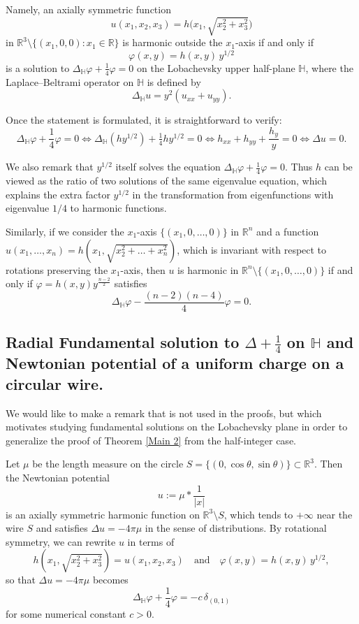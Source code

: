 \documentclass{article}
\begin{document}
Namely, an axially symmetric function
\[
u(x_1,x_2,x_3)=h\bigl(x_1, \sqrt{x_2^2+x_3^2}\bigr)
\]
in \(\mathbb{R}^3 \setminus \{(x_1,0,0): x_1\in\mathbb{R}\}\) is harmonic outside the \(x_1\)-axis if and only if
\[
\varphi(x,y)=h(x,y)\,y^{1/2}
\]
is a solution to \(\Delta_\mathbb{H}\varphi+\frac{1}{4}\varphi=0\) on the Lobachevsky upper half-plane \(\mathbb{H}\), where
the Laplace--Beltrami operator on \(\mathbb{H}\) is defined by
\[
\Delta_\mathbb{H}u = y^2(u_{xx}+u_{yy}).
\]

Once the statement is formulated, it is straightforward to verify:
\[
\Delta_\mathbb{H}\varphi+\frac{1}{4}\varphi=0 
\iff \Delta_\mathbb{H}(h y^{1/2})+\tfrac{1}{4}h y^{1/2}=0 
\iff h_{xx}+h_{yy}+\frac{h_y}{y}=0 \iff \Delta u=0.
\]

We also remark that \(y^{1/2}\) itself solves the equation \(\Delta_\mathbb{H}\varphi+\frac{1}{4}\varphi=0\). Thus \(h\) can be viewed as the ratio of two solutions of the same eigenvalue equation, which explains the extra factor \(y^{1/2}\) in the transformation from eigenfunctions with eigenvalue $1/4$ to harmonic functions.

 Similarly, if we consider the $x_1$-axis $\{(x_1,0,\dots,0)\}$ in $\mathbb{R}^n$ and a function $u(x_1,\dots,x_n)=h(x_1,\sqrt{x_2^2+\dots+x_n^2})$, which is invariant with respect to rotations preserving the $x_1$-axis, then $u$ is harmonic in 
 $\mathbb{R}^n\setminus \{(x_1,0,\dots,0)\}$ if and only if $\varphi=h(x,y)y^{\frac{n-2}{2}}$ satisfies 
 $$\Delta_\mathbb{H} \varphi - \frac{(n-2)(n-4)}{4}\varphi=0.$$

 
\subsection*{Radial Fundamental solution to $\Delta + \frac{1}{4} $ on $\mathbb{H}$ and Newtonian potential of a uniform charge on a circular wire.}
We would like to make a remark that is not used in the proofs, but which
motivates studying fundamental solutions on the Lobachevsky plane in
order to generalize the proof of Theorem \ref{Main 2} from the
half-integer case.

Let $\mu$ be the length measure on the circle
$S=\{(0,\cos \theta, \sin \theta)\} \subset \mathbb{R}^3$. Then the
Newtonian potential
\[
u := \mu * \frac{1}{|x|}
\]
is an axially symmetric harmonic function on $\mathbb{R}^3 \setminus S$,
which tends to $+\infty$ near the wire $S$ and satisfies
$\Delta u = -4\pi \mu$ in the sense of distributions. By rotational symmetry,
we can rewrite $u$ in terms of
\[
h(x_1,\sqrt{x_2^2+x_3^2}) = u(x_1,x_2,x_3)
\quad\text{and}\quad
\varphi(x,y) = h(x,y)\,y^{1/2},
\]
so that $\Delta u = -4\pi \mu$ becomes
\[
\Delta_\mathbb{H} \varphi + \frac{1}{4} \varphi = -c \,\delta_{(0,1)}
\]
for some numerical constant $c>0$.
\end{document}

